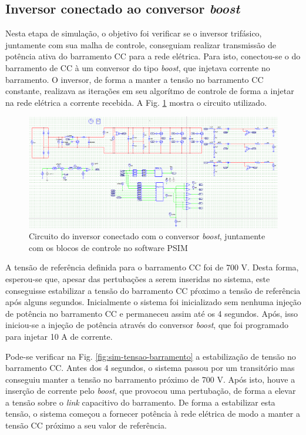 \subsection{Inversor conectado ao conversor \textit{boost}}

Nesta etapa de simulação, o objetivo foi verificar se o inversor trifásico, juntamente com sua malha de controle, conseguiam realizar transmissão de potência ativa do barramento CC para a rede elétrica. 
Para isto, conectou-se o do barramento de CC à um conversor do tipo \textit{boost}, que injetava corrente no barramento.
O inversor, de forma a manter a tensão no barramento CC constante, realizava as iterações em seu algorítmo de controle de forma a injetar na rede elétrica a corrente recebida.
A Fig. \ref{fig:sim-circuito-inversor-boost} mostra o circuito utilizado.

\begin{figure}[!hbt]
	\begin{center}
    \includegraphics[width=\textwidth]{figuras/sim_figures/sistema_completo/montagem/sistema_completo.PNG}    \centering
    \caption{Circuito do inversor conectado com o conversor \textit{boost}, juntamente com os blocos de controle no software PSIM}
    \label{fig:sim-circuito-inversor-boost}
    \end{center}
\end{figure}

A tensão de referência definida para o barramento CC foi de 700 V. Desta forma, esperou-se que, apesar das pertubações a serem inseridas no sistema, este conseguisse estabilizar a tensão do barramento CC pŕoximo a tensão de referência após alguns segundos. 
Inicialmente o sistema foi inicializado sem nenhuma injeção de potência no barramento CC e permaneceu assim até os 4 segundos. Após, isso iniciou-se a injeção de potência através do conversor \textit{boost}, que foi programado para injetar 10 A de corrente.

Pode-se verificar na Fig. \ref{fig:sim-tensao-barramento} a estabilização de tensão no barramento CC. 
Antes dos 4 segundos, o sistema passou por um transitório mas conseguiu manter a tensão no barramento próximo de 700 V. 
Após isto, houve a inserção de corrente pelo \textit{boost}, que provocou uma pertubação, de forma a elevar a tensão sobre o \textit{link} capacitivo do barramento.
De forma a estabilizar esta tensão, o sistema começou a fornecer potência à rede elétrica de modo a manter a tensão CC próximo a seu valor de referência.

